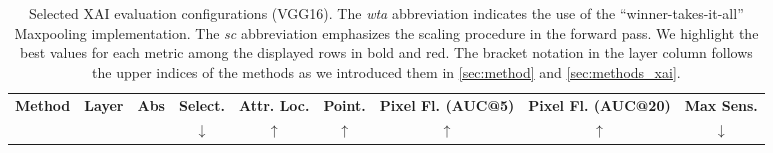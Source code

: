\begin{table}[htb!]
    \centering
    \small
    \caption{Selected XAI evaluation configurations (VGG16). The \emph{wta} abbreviation indicates the use of the ``winner-takes-it-all'' Maxpooling implementation. The \emph{sc} abbreviation emphasizes the scaling procedure in the forward pass. We highlight the best values for each metric among the displayed rows in bold and red. The bracket notation in the layer column follows the upper indices of the methods as we introduced them in \cref{sec:method} and \cref{sec:methods_xai}.}
    \label{tab:eval_vgg_main}
    \begin{tabular}{p{4cm}|cc|cccccc}
        \toprule
        \textbf{Method} & \textbf{Layer} & \textbf{Abs} & \textbf{Select.} & \textbf{Attr. Loc.} & \textbf{Point.} & \textbf{Pixel Fl. (AUC@5)} & \textbf{Pixel Fl. (AUC@20)} & \textbf{Max Sens.} \\
        & & & \textbf{$\downarrow$} & \textbf{$\uparrow$} & \textbf{$\uparrow$} & \textbf{$\uparrow$} & \textbf{$\uparrow$} & \textbf{$\downarrow$} \\
        

\end{tabular}
\end{table}
